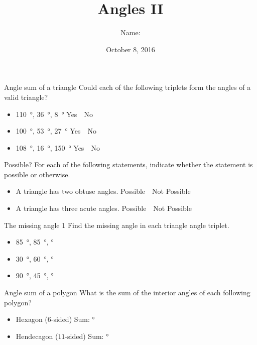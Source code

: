 \documentclass[14pt,letterpaper]{article}
\title{Angles II}
\author{Name: \underline{\hspace{5cm}}}
\date{October 8, 2016}
\begin{document}
\HomeworkTitle

\thispagestyle{empty}

\begin{problem}{Angle sum of a triangle}
 Could each of the following triplets form the angles of a valid triangle?

 \begin{itemize}
  \item \SI{110}{\degree}, \SI{36}{\degree}, \SI{8}{\degree}
  \hfill Yes~~No
  \item \SI{100}{\degree}, \SI{53}{\degree}, \SI{27}{\degree}
  \hfill Yes~~No
  \item \SI{108}{\degree}, \SI{16}{\degree}, \SI{150}{\degree}
  \hfill Yes~~No
 \end{itemize}
\end{problem}

\begin{problem}{Possible?}
 For each of the following statements, indicate whether the statement is
 possible or otherwise.

 \begin{itemize}
  \item A triangle has two obtuse angles.
  \hfill Possible~~Not Possible
  \item A triangle has three acute angles.
  \hfill Possible~~Not Possible
 \end{itemize}
\end{problem}

\begin{problem}{The missing angle 1}
 Find the missing angle in each triangle angle triplet.

 \begin{itemize}
  \item \SI{85}{\degree}, \SI{85}{\degree},
  \blankC \si{\degree}
  \item \SI{30}{\degree}, \SI{60}{\degree},
  \blankC \si{\degree}
  \item \SI{90}{\degree}, \SI{45}{\degree},
  \blankC \si{\degree}
 \end{itemize}
\end{problem}

\begin{problem}{Angle sum of a polygon}
 What is the sum of the interior angles of each following polygon?

 \begin{itemize}
  \item Hexagon ($6$-sided)
  \hfill Sum: \blankC \si{\degree}
  \item Hendecagon ($11$-sided)
  \hfill Sum: \blankC \si{\degree}
 \end{itemize}
\end{problem}
\end{document}
